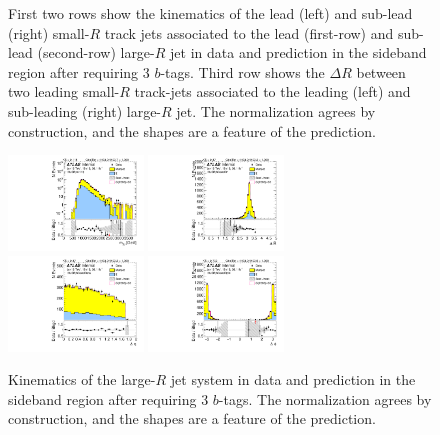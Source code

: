 \begin{figure}[htbp!]
\begin{center}
  \caption{First two rows show the kinematics of the lead (left) and sub-lead (right) small-$R$ track jets associated to the lead (first-row) and sub-lead (second-row) large-$R$ jet in data and prediction in the sideband region after requiring 3 $b$-tags. Third row shows the $\Delta R$ between two leading small-$R$ track-jets associated to the leading (left) and sub-leading (right) large-$R$ jet. The normalization agrees by construction, and the shapes are a feature of the prediction. }
  \label{fig:boosted-3b-sideband-ak2}
\end{center}
\end{figure}


\begin{figure}[htbp!]
\begin{center}
\includegraphics[width=0.32\textwidth,angle=-90]{figures/boosted/Sideband/b77_ThreeTag_Sideband_mHH_l_1.pdf}
\includegraphics[width=0.32\textwidth,angle=-90]{figures/boosted/Sideband/b77_ThreeTag_Sideband_hCandDr.pdf}\\
\includegraphics[width=0.32\textwidth,angle=-90]{figures/boosted/Sideband/b77_ThreeTag_Sideband_hCandDeta.pdf}
\includegraphics[width=0.32\textwidth,angle=-90]{figures/boosted/Sideband/b77_ThreeTag_Sideband_hCandDphi.pdf}
  \caption{Kinematics of the large-$R$ jet system in data and prediction in the sideband region after requiring 3 $b$-tags. The normalization agrees by construction, and the shapes are a feature of the prediction. }
  \label{fig:boosted-3b-sideband-ak10-system}
\end{center}
\end{figure}

